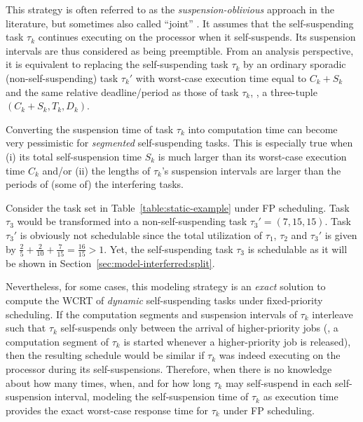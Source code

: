 \label{sec:model-interferred-oblivious}

This strategy is often referred to as the \emph{suspension-oblivious} approach in the literature, but sometimes also called ``joint'' \cite{bletsas:thesis}. It assumes that the self-suspending task $\tau_k$ continues executing on the processor when it self-suspends. Its suspension intervals are thus considered as being preemptible. From an analysis perspective, it is equivalent to replacing the self-suspending task $\tau_k$ by an ordinary sporadic (non-self-suspending) task $\tau_k'$ with worst-case execution time equal to $C_k + S_k$ and the same relative deadline/period as those of task $\tau_k$, \ie, a three-tuple $(C_k+S_k, T_k, D_k)$. 

Converting the suspension time of task $\tau_k$ into computation time can become very pessimistic for \emph{segmented} self-suspending tasks. This is especially true when (i) its total self-suspension time $S_k$ is much larger than its worst-case execution time $C_k$ and/or (ii) the lengths of $\tau_k$'s suspension intervals are larger than the periods of (some of) the interfering tasks. 

\begin{example}
\label{ex:suspension-as-comput}   
Consider the task set in Table~\ref{table:static-example} under FP scheduling. Task $\tau_3$ would be transformed into a non-self-suspending task $\tau_3'=(7,15,15)$. Task $\tau_3'$ is obviously not schedulable since the total utilization of $\tau_1$, $\tau_2$ and $\tau_3'$ is given by $\frac{2}{5} + \frac{2}{10} + \frac{7}{15} = \frac{16}{15} > 1$. Yet, the self-suspending task $\tau_3$ is schedulable as it will be shown in Section~\ref{sec:model-interferred:split}.
\hfill\myendproof  
\end{example}

Nevertheless, for some cases, this modeling strategy is an \emph{exact} solution to compute the WCRT of \emph{dynamic} self-suspending tasks under fixed-priority scheduling. If the computation segments and suspension intervals of $\tau_k$ interleave such that $\tau_k$ self-suspends only between the arrival of higher-priority jobs
(\ie,  a computation segment of $\tau_k$ is started whenever a higher-priority job is released), then the resulting schedule would be similar if $\tau_k$ was indeed executing on the processor during its self-suspensions. Therefore, when there is no knowledge about how many times, when, and for how long $\tau_k$ may self-suspend in each 
self-suspension interval, modeling the self-suspension time of $\tau_k$ as execution time provides the exact worst-case response 
time for $\tau_k$ under FP scheduling. 

